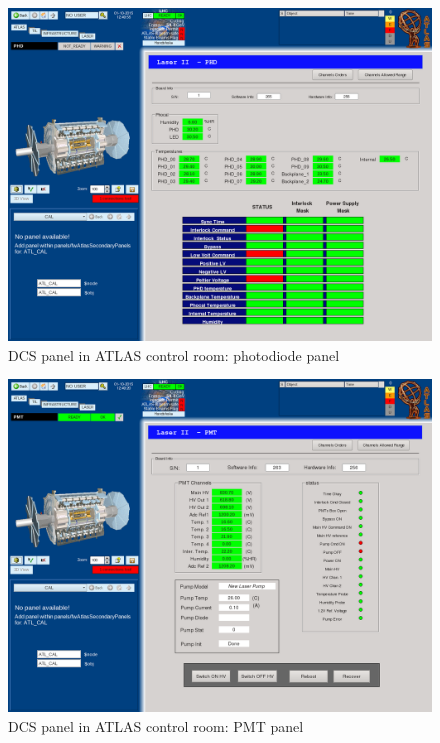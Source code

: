 \begin{appendices}
\begin{figure}[htbp]
\centering
\includegraphics[width=16cm]{figures/dcs_cr_phd.png}
\caption{DCS panel in ATLAS control room: photodiode panel}\label{fig:dcs_cr_b}
\end{figure}

\begin{figure}[htbp]
\centering
\includegraphics[width=16cm]{figures/dcs_cr_pmt.png}
\caption{DCS panel in ATLAS control room: PMT panel}\label{fig:dcs_cr_c}
\end{figure}


\end{appendices}
